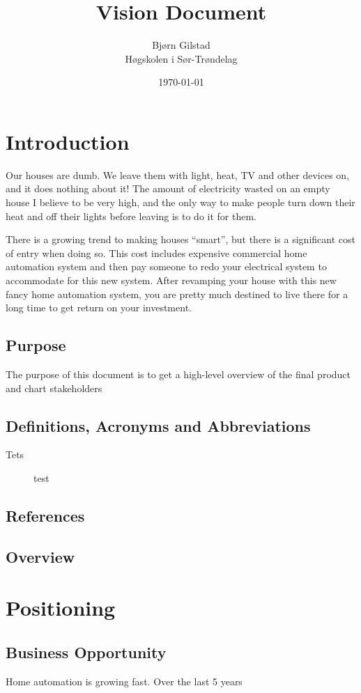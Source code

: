 \documentclass[12pt,norsk,a4paper]{article}
\title{Vision Document}
\author{Bjørn Gilstad \\
  Høgskolen i Sør-Trøndelag\\
}
\date{\today}
\begin{document}
\maketitle

\section{Introduction}
Our houses are dumb. We leave them with light, heat, TV and other devices on, and it does nothing about
it! The amount of electricity wasted on an empty house I believe to be very high, and the only way to
make people turn down their heat and off their lights before leaving is to do it for them.

There is a growing trend to making houses ``smart'', but there is a significant cost of entry when
doing so. This cost includes expensive commercial home automation system and then pay someone to
redo your electrical system to accommodate for this new system. After revamping your house with this
new fancy home automation system, you are pretty much destined to live there for a long time to get
return on your investment.


\subsection{Purpose}
The purpose of this document is to get a high-level overview of the final product and chart
stakeholders
 

\subsection{Definitions, Acronyms and Abbreviations}
\begin{description}
  \item[Tets] test
\end{description}

\subsection{References}

\subsection{Overview}

\section{Positioning}
\subsection{Business Opportunity}
Home automation is growing fast. Over the last 5 years
\end{document}
